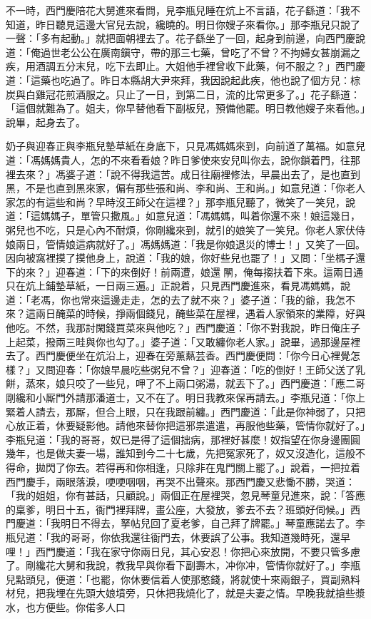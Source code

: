 不一時，西門慶陪花大舅進來看問，見李瓶兒睡在炕上不言語，花子繇道：「我不知道，昨日聽見這邊大官兒去說，纔曉的。明日你嫂子來看你。」那李瓶兒只說了一聲：「多有起動。」{}就把面朝裡去了。花子繇坐了一回，起身到前邊，向西門慶說道：「俺過世老公公在廣南鎭守，帶的那三七藥，曾吃了不曾？不拘婦女甚崩漏之疾，用酒調五分末兒，吃下去即止。大姐他手裡曾收下此藥，何不服之？」西門慶道：「這藥也吃過了。昨日本縣胡大尹來拜，我因說起此疾，他也說了個方兒：棕炭與白雞冠花煎酒服之。只止了一日，到第二日，流的比常更多了。」花子繇道：「這個就難為了。姐夫，你早替他看下副板兒，預備他罷。明日教他嫂子來看他。」說畢，起身去了。

奶子與迎春正與李瓶兒墊草紙在身底下，只見馮媽媽來到，向前道了萬福。如意兒道：「馮媽媽貴人，怎的不來看看娘？昨日爹使來安兒叫你去，說你鎖着門，往那裡去來？」馮婆子道：「說不得我這苦。成日往廟裡修法，早晨出去了，是也直到黑，不是也直到黑來家，偏有那些張和尚、李和尚、王和尚。」{}如意兒道：「你老人家怎的有這些和尚？早時沒王師父在這裡？」那李瓶兒聽了，微笑了一笑兒，說道：「這媽媽子，單管只撒風。」如意兒道：「馮媽媽，叫着你還不來！娘這幾日，粥兒也不吃，只是心內不耐煩，你剛纔來到，就引的娘笑了一笑兒。你老人家伏侍娘兩日，管情娘這病就好了。」馮媽媽道：「我是你娘退災的博士！」又笑了一回。因向被窩裡摸了摸他身上，說道：「我的娘，你好些兒也罷了！」又問：「坐榪子還下的來？」迎春道：「下的來倒好！前兩遭，娘還𨴃䦛，俺每搊扶着下來。這兩日通只在炕上鋪墊草紙，一日兩三遍。」正說着，只見西門慶進來，看見馮媽媽，說道：「老馮，你也常來這邊走走，怎的去了就不來？」婆子道：「我的爺，我怎不來？這兩日醃菜的時候，掙兩個錢兒，醃些菜在屋裡，遇着人家領來的業障，好與他吃。不然，我那討閑錢買菜來與他吃？」{}西門慶道：「你不對我說，昨日俺庄子上起菜，撥兩三畦與你也勾了。」婆子道：「又敢纏你老人家。」說畢，過那邊屋裡去了。西門慶便坐在炕沿上，迎春在旁薰爇芸香。西門慶便問：「你今日心裡覺怎樣？」又問迎春：「你娘早晨吃些粥兒不曾？」迎春道：「吃的倒好！王師父送了乳餅，蒸來，娘只咬了一些兒，呷了不上兩口粥湯，就丟下了。」西門慶道：「應二哥剛纔和小厮門外請那潘道士，又不在了。明日我教來保再請去。」李瓶兒道：「你上緊着人請去，那厮，但合上眼，只在我跟前纏。」西門慶道：「此是你神弱了，只把心放正着，休要疑影他。請他來替你把這邪祟遣遣，再服他些藥，管情你就好了。」李瓶兒道：「我的哥哥，奴已是得了這個拙病，那裡好甚麼！奴指望在你身邊團圓幾年，也是做夫妻一場，誰知到今二十七歲，先把冤家死了，奴又沒造化，這般不得命，拋閃了你去。若得再和你相逢，只除非在鬼門關上罷了。」說着，一把拉着西門慶手，兩眼落淚，哽哽咽咽，再哭不出聲來。那西門慶又悲慟不勝，哭道：「我的姐姐，你有甚話，只顧說。」兩個正在屋裡哭，忽見琴童兒進來，說：「答應的稟爹，明日十五，衙門裡拜牌，畫公座，大發放，爹去不去？班頭好伺候。」西門慶道：「我明日不得去，拏帖兒回了夏老爹，自己拜了牌罷。」琴童應諾去了。李瓶兒道：「我的哥哥，你依我還往衙門去，休要誤了公事。我知道幾時死，還早哩！」西門慶道：「我在家守你兩日兒，其心安忍！你把心來放開，不要只管多慮了。剛纔花大舅和我說，教我早與你看下副壽木，冲你冲，管情你就好了。」李瓶兒點頭兒，便道：「也罷，你休要信着人使那憨錢，將就使十來兩銀子，買副熟料材兒，把我埋在先頭大娘墳旁，只休把我燒化了，就是夫妻之情。早晚我就搶些漿水，也方便些。你偌多人口